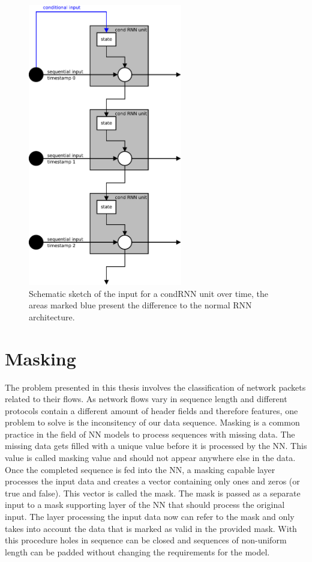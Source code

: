 \documentclass[
	ngerman,
	ruledheaders=section,%
	class=report,%
	thesis={type=bachelor},%
	accentcolor=9c,%
	custommargins=true,%
	marginpar=false,%
	parskip=half-,%
	fontsize=11pt,%
]{tudapub}
\begin{document}
\begin{figure}
    \includegraphics[width=0.6\textwidth]{condRNN.pdf}
    \caption{Schematic sketch of the input for a condRNN unit over time, the areas marked blue present the difference to the normal RNN architecture.}
    \label{fig:condRNN}
\end{figure}

\section{Masking}

The problem presented in this thesis involves the classification of network packets related to their flows.
As network flows vary in sequence length and different protocols contain a different amount of header fields and therefore features, one problem to solve is the inconsitency of our data sequence.
Masking is a common practice in the field of NN models to process sequences with missing data.
The missing data gets filled with a unique value before it is processed by the NN.
This value is called masking value and should not appear anywhere else in the data.
Once the completed sequence is fed into the NN, a masking capable layer processes the input data and creates a vector containing only ones and zeros (or true and false).
This vector is called the mask.
The mask is passed as a separate input to a mask supporting layer of the NN that should process the original input.
The layer processing the input data now can refer to the mask and only takes into account the data that is marked as valid in the provided mask.
With this procedure holes in sequence can be closed and sequences of non-uniform length can be padded without changing the requirements for the model. %
\end{document}
